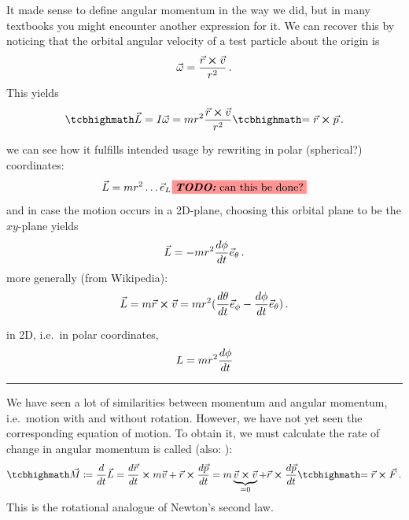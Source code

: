 \documentclass[../class_mech_main.tex]{subfiles}
\begin{document}
It made sense to define angular momentum in the way we did, but in many textbooks you might encounter another expression for it. We can recover this by noticing that the orbital angular velocity of a test particle about the origin is
\begin{equation}
	\vec{\omega} = \frac{\vec{r} \cross \vec{v}}{r^2} \, .
\end{equation}
This yields
\begin{equation}\label{eq:angular_momentum_2}
    \eqbox{
		\vec{L}} = I \vec{\omega} = m r^2 \frac{\vec{r} \cross \vec{v}}{r^2} \eqbox{= \vec{r} \cross \vec{p}
	} \, .
\end{equation}



we can see how it fulfills intended usage by rewriting in polar (spherical?) coordinates:
\begin{equation}
    \vec{L} = m r^2 \dots \vec{e}_L \todo{can this be done?}
\end{equation}
and in case the motion occurs in a 2D-plane, choosing this orbital plane to be the $xy$-plane yields
\begin{equation}
    \vec{L} = - m r^2 \dv{\phi}{t} \vec{e}_\theta
	\, .
\end{equation}
more generally (from Wikipedia):
\begin{equation}
	\vec{L} = m \vec{r} \cross \vec{v} = m r^2 (\dv{\theta}{t} \vec{e}_\phi - \dv{\phi}{t} \vec{e}_\theta)
	\, .
\end{equation}

in 2D, i.e.~in polar coordinates,
\begin{equation}
	L = m r^2 \dv{\phi}{t}
\end{equation}


\hrule


We have seen a lot of similarities between momentum and angular momentum, i.e.~motion with and without rotation. However, we have not yet seen the corresponding equation of motion. To obtain it, we must calculate the rate of change in angular momentum is called  (also: ):
\begin{equation}
    \eqbox{\vec{M}} \coloneqq \dv{t} \vec{L} = \dv{\vec{r}}{t} \cross m \vec{v} + \vec{r} \cross \dv{\vec{p}}{t} = m \underbrace{\vec{v} \cross \vec{v}}_{= 0} + \vec{r} \cross \dv{\vec{p}}{t} \eqbox{= \vec{r} \cross \vec{F}} \, .
\end{equation}
This is the rotational analogue of Newton's second law.
\end{document}
